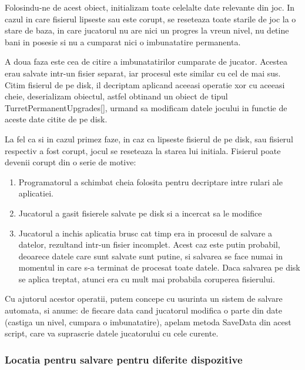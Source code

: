 \documentclass[12pt, a4paper]{article}
\begin{document}
	Folosindu-ne de acest obiect, initializam toate celelalte date relevante din joc. In cazul in care fisierul lipseste sau este corupt, se reseteaza toate starile de joc la o stare de baza, in care jucatorul nu are nici un progres la vreun nivel, nu detine bani in posesie si nu a cumparat nici o imbunatatire permanenta.
	\newline
	
	A doua faza este cea de citire a imbunatatirilor cumparate de jucator. Acestea erau salvate intr-un fisier separat, iar procesul este similar cu cel de mai sus. Citim fisierul de pe disk, il decriptam aplicand aceeasi operatie xor cu aceeasi cheie, deserializam obiectul, astfel obtinand un obiect de tipul TurretPermanentUpgrades[], urmand sa modificam datele jocului in functie de aceste date citite de pe disk.
	\newline
	
	La fel ca si in cazul primez faze, in caz ca lipseste fisierul de pe disk, sau fisierul respectiv a fost corupt, jocul se reseteaza la starea lui initiala. Fisierul poate devenii corupt din o serie de motive:
	
	\begin{enumerate}
		\item Programatorul a schimbat cheia folosita pentru decriptare intre rulari ale aplicatiei.
		\item Jucatorul a gasit fisierele salvate pe disk si a incercat sa le modifice
		\item Jucatorul a inchis aplicatia brusc cat timp era in procesul de salvare a datelor, rezultand intr-un fisier incomplet. Acest caz este putin probabil, deoarece datele care sunt salvate sunt putine, si salvarea se face numai in momentul in care s-a terminat de procesat toate datele. Daca salvarea pe disk se aplica treptat, atunci era cu mult mai probabila coruperea fisierului.
	\end{enumerate}

	Cu ajutorul acestor operatii, putem concepe cu usurinta un sistem de salvare automata, si anume: de fiecare data cand jucatorul modifica o parte din date (castiga un nivel, cumpara o imbunatatire), apelam metoda SaveData din acest script, care va suprascrie datele jucatorului cu cele curente.
	
	
	
	
	\subsubsection{Locatia pentru salvare pentru diferite dispozitive}
	\label{section: androidSave}
	
\end{document}
